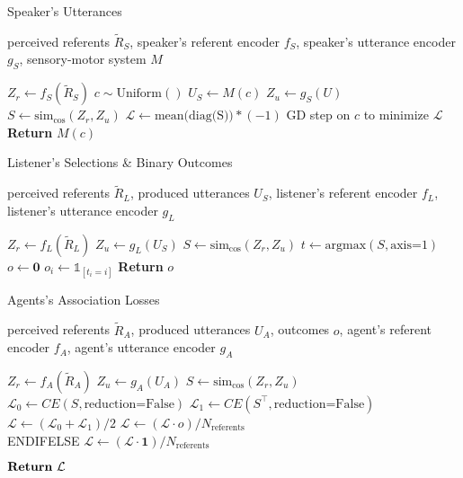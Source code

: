 \begin{algorithm}
\caption{Speaker's Utterances}\label{alg:sp}
\begin{algorithmic}

\REQUIRE perceived referents $\tilde{R}_S$, speaker's referent encoder $f_S$, speaker's utterance encoder $g_S$, sensory-motor system $M$

\STATE $Z_r \gets f_S(\tilde{R}_S) $
\STATE $c \sim \textrm{Uniform}()$
    \STATE $U_S \gets M(c)$
    \STATE $Z_u \gets g_S(U)$
    \STATE $S \gets \textrm{sim}_{\textrm{cos}}(Z_r,Z_u)$
    \STATE $\mathcal{L} \gets \textrm{mean(diag(S))} * (-1)$
    \STATE GD step on $c$ to minimize $\mathcal{L}$
\ENDFOR
\STATE \textrm{\textbf{Return} }$M(c)$
\end{algorithmic}
\end{algorithm}

\begin{algorithm}
\caption{Listener's Selections \& Binary Outcomes}\label{alg:ls}
\begin{algorithmic}

\REQUIRE perceived referents $\tilde{R}_L$, produced utterances $U_S$, listener's referent encoder $f_L$, listener's utterance encoder $g_L$

\STATE $Z_r \gets f_L(\tilde{R}_L) $
\STATE $Z_u \gets g_L(U_S) $
\STATE $S\gets \textrm{sim}_{\textrm{cos}}(Z_r,Z_u)$
\STATE $t \gets \textrm{argmax}(S, \textrm{axis=}1)$
\STATE $o \gets \textbf{0}$
    \STATE $o_i \gets \mathds{1}_{[t_i = i]}$
\ENDFOR
\STATE \textrm{\textbf{Return} }$o$
\end{algorithmic}
\end{algorithm}

\begin{algorithm}
\caption{Agents's Association Losses}\label{alg:al}
\begin{algorithmic}

\REQUIRE perceived referents $\tilde{R}_A$, produced utterances $U_A$, outcomes $o$, agent's referent encoder $f_A$, agent's utterance encoder $g_A$

\STATE $Z_r \gets f_A(\tilde{R}_A) $
\STATE $Z_u \gets g_A(U_A) $
\STATE $S\gets \textrm{sim}_{\textrm{cos}}(Z_r,Z_u)$
\STATE $\mathcal{L}_0 \gets CE(S, \textrm{reduction=False})$
\STATE $\mathcal{L}_1 \gets CE(S^{\top},\textrm{reduction=False})$
\STATE $\mathcal{L} \gets (\mathcal{L}_0 + \mathcal{L}_1)/2$
    \STATE $\mathcal{L} \gets (\mathcal{L} \cdot o) / N_{\textrm{referents}}$
\\ENDIFELSE 
    \STATE $\mathcal{L} \gets (\mathcal{L} \cdot \textbf{1}) / N_{\textrm{referents}}$
\ENDIF 

\STATE $\textrm{\textbf{Return} } \mathcal{L}$
\end{algorithmic}
\end{algorithm}